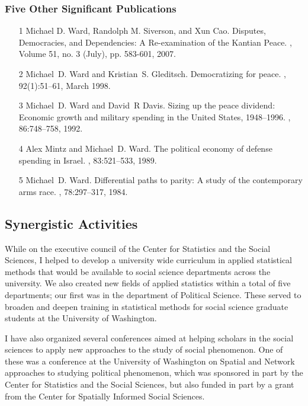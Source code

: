 \documentclass[pdftex,12pt,fullpage,oneside]{amsart}
\begin{document}
\subsubsection*{Five Other Significant Publications}
\begin{itemize}

\item[1]  Michael D. Ward, Randolph M. Siverson, and Xun Cao.
\newblock Disputes, Democracies, and Dependencies: A Re-examination of the Kantian Peace.
, Volume 51, no. 3 (July), pp. 583-601, 2007.
   
\item[2]
Michael~D. Ward and Kristian~S. Gleditsch.
\newblock Democratizing for peace.
, 92(1):51--61, March 1998.
 
 \item[3]Michael~D. Ward and David~R Davis.
\newblock Sizing up the peace dividend: Economic growth and military spending
  in the {United States}, 1948--1996.
, {86}:748--758, 1992.
 
 \item[4]
Alex Mintz and Michael~D. Ward.
\newblock The political economy of defense spending in {I}srael.
, 83:521--533, 1989.

\item[5]
Michael~D. Ward.
\newblock Differential paths to parity: A study of the contemporary arms race.
, {78}:297--317, 1984.

\end{itemize}
\subsection*{Synergistic Activities}
While on the executive council of the Center for Statistics and the
Social Sciences, I helped to develop a university wide curriculum in
applied statistical methods that would be available to social science
departments across the university. We also created new fields of
applied statistics within a total of five departments; our first was
in the department of Political Science. These served to broaden and
deepen training in statistical methods for social science graduate
students at the University of Washington.

I have also organized several conferences aimed at helping scholars in
the social sciences to apply new approaches to the study of social
phenomenon. One of these was a conference at the University of
Washington on Spatial and Network approaches to studying political
phenomenon, which was sponsored in part by the Center for Statistics
and the Social Sciences, but also funded in part by a grant from the
Center for Spatially Informed Social Sciences.
\end{document}
